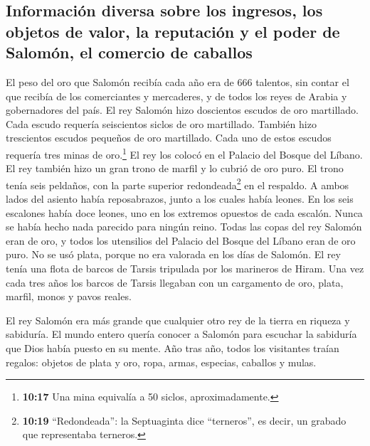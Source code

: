 \hypertarget{informaciuxf3n-diversa-sobre-los-ingresos-los-objetos-de-valor-la-reputaciuxf3n-y-el-poder-de-salomuxf3n-el-comercio-de-caballos}{%
\subsection{Información diversa sobre los ingresos, los objetos de
valor, la reputación y el poder de Salomón, el comercio de
caballos}\label{informaciuxf3n-diversa-sobre-los-ingresos-los-objetos-de-valor-la-reputaciuxf3n-y-el-poder-de-salomuxf3n-el-comercio-de-caballos}}

 El peso del oro que Salomón recibía cada año era de 666
talentos,  sin contar el que recibía de los comerciantes
y mercaderes, y de todos los reyes de Arabia y gobernadores del país.
 El rey Salomón hizo doscientos escudos de oro
martillado. Cada escudo requería seiscientos siclos de oro martillado.
 También hizo trescientos escudos pequeños de oro
martillado. Cada uno de estos escudos requería tres minas de
oro.\footnote{\textbf{10:17} Una mina equivalía a 50 siclos,
  aproximadamente.} El rey los colocó en el Palacio del Bosque del
Líbano.  El rey también hizo un gran trono de marfil y lo
cubrió de oro puro.  El trono tenía seis peldaños, con la
parte superior redondeada\footnote{\textbf{10:19} ``Redondeada'': la
  Septuaginta dice ``terneros'', es decir, un grabado que representaba
  terneros.} en el respaldo. A ambos lados del asiento había
reposabrazos, junto a los cuales había leones.  En los
seis escalones había doce leones, uno en los extremos opuestos de cada
escalón. Nunca se había hecho nada parecido para ningún reino.
 Todas las copas del rey Salomón eran de oro, y todos los
utensilios del Palacio del Bosque del Líbano eran de oro puro. No se usó
plata, porque no era valorada en los días de Salomón.  El
rey tenía una flota de barcos de Tarsis tripulada por los marineros de
Hiram. Una vez cada tres años los barcos de Tarsis llegaban con un
cargamento de oro, plata, marfil, monos y pavos reales.

 El rey Salomón era más grande que cualquier otro rey de
la tierra en riqueza y sabiduría.  El mundo entero quería
conocer a Salomón para escuchar la sabiduría que Dios había puesto en su
mente.  Año tras año, todos los visitantes traían
regalos: objetos de plata y oro, ropa, armas, especias, caballos y
mulas.


